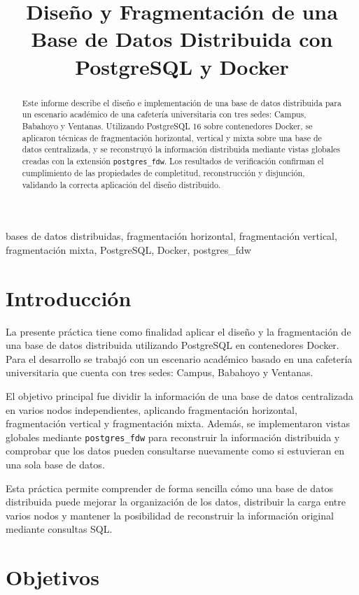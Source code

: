 \documentclass[conference]{IEEEtran}
\title{Diseño y Fragmentación de una Base de Datos Distribuida con PostgreSQL y Docker}
\author{
\IEEEauthorblockN{Ivan Andres Villamarin}
\IEEEauthorblockA{
Aplicaciones Distribuidas\\
Universidad Técnica Estatal de Quevedo\\
Quevedo, Ecuador}
}
\begin{document}
\maketitle

\begin{abstract}
Este informe describe el diseño e implementación de una base de datos distribuida para un escenario académico de una cafetería universitaria con tres sedes: Campus, Babahoyo y Ventanas. Utilizando PostgreSQL 16 sobre contenedores Docker, se aplicaron técnicas de fragmentación horizontal, vertical y mixta sobre una base de datos centralizada, y se reconstruyó la información distribuida mediante vistas globales creadas con la extensión \texttt{postgres\_fdw}. Los resultados de verificación confirman el cumplimiento de las propiedades de completitud, reconstrucción y disjunción, validando la correcta aplicación del diseño distribuido.
\end{abstract}

\begin{IEEEkeywords}
bases de datos distribuidas, fragmentación horizontal, fragmentación vertical, fragmentación mixta, PostgreSQL, Docker, postgres\_fdw
\end{IEEEkeywords}

\section{Introducción}
La presente práctica tiene como finalidad aplicar el diseño y la fragmentación de una base de datos distribuida utilizando PostgreSQL en contenedores Docker. Para el desarrollo se trabajó con un escenario académico basado en una cafetería universitaria que cuenta con tres sedes: Campus, Babahoyo y Ventanas.

El objetivo principal fue dividir la información de una base de datos centralizada en varios nodos independientes, aplicando fragmentación horizontal, fragmentación vertical y fragmentación mixta. Además, se implementaron vistas globales mediante \texttt{postgres\_fdw} para reconstruir la información distribuida y comprobar que los datos pueden consultarse nuevamente como si estuvieran en una sola base de datos.

Esta práctica permite comprender de forma sencilla cómo una base de datos distribuida puede mejorar la organización de los datos, distribuir la carga entre varios nodos y mantener la posibilidad de reconstruir la información original mediante consultas SQL.

\section{Objetivos}
\end{document}
